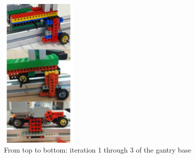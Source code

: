 \documentclass{article}
\begin{document}
\begin{figure}[h!]
    \centering
    \includegraphics[height=280,keepaspectratio,width=1\linewidth]{figs/stagesofbase.png}
    \caption{From top to bottom: iteration 1 through 3 of the gantry base}
    \label{fig:stages}
\end{figure}
\end{document}
